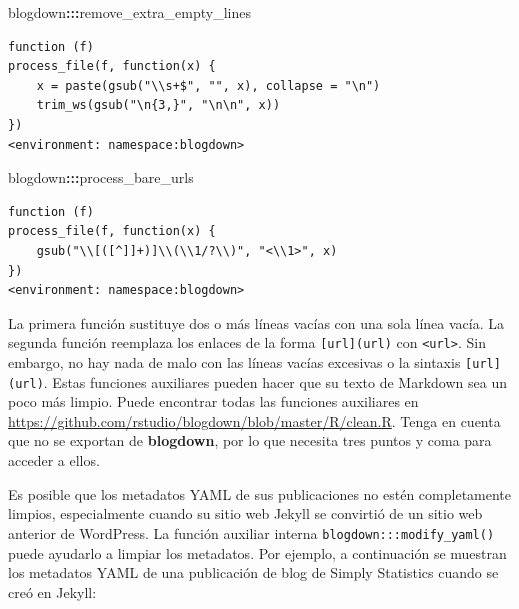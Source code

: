 \documentclass[12pt,]{krantz}
\makeatletter
\newenvironment{Shaded}{\begin{snugshade}}{\end{snugshade}}
\newcommand{\NormalTok}[1]{#1}
\newcommand{\OperatorTok}[1]{\textcolor[rgb]{0.81,0.36,0.00}{\textbf{#1}}}
\newenvironment{kframe}{%
\medskip{}
\setlength{\fboxsep}{.8em}
 \def\at@end@of@kframe{}%
 \ifinner\ifhmode%
  \def\at@end@of@kframe{\end{minipage}}%
  \begin{minipage}{\columnwidth}%
 \fi\fi%
 \def\FrameCommand##1{\hskip\@totalleftmargin \hskip-\fboxsep
 \colorbox{shadecolor}{##1}\hskip-\fboxsep
     \hskip-\linewidth \hskip-\@totalleftmargin \hskip\columnwidth}%
 \MakeFramed {\advance\hsize-\width
   \@totalleftmargin\z@ \linewidth\hsize
   \@setminipage}}%
 {\par\unskip\endMakeFramed%
 \at@end@of@kframe}
\renewenvironment{Shaded}{\begin{kframe}}{\end{kframe}}
\theoremstyle{definition}
\theoremstyle{definition}
\theoremstyle{definition}
\theoremstyle{remark}
\makeatother
\begin{document}
\begin{Shaded}
\begin{Highlighting}[]
\NormalTok{blogdown}\OperatorTok{:::}\NormalTok{remove_extra_empty_lines}
\end{Highlighting}
\end{Shaded}

\begin{verbatim}
function (f) 
process_file(f, function(x) {
    x = paste(gsub("\\s+$", "", x), collapse = "\n")
    trim_ws(gsub("\n{3,}", "\n\n", x))
})
<environment: namespace:blogdown>
\end{verbatim}

\begin{Shaded}
\begin{Highlighting}[]
\NormalTok{blogdown}\OperatorTok{:::}\NormalTok{process_bare_urls}
\end{Highlighting}
\end{Shaded}

\begin{verbatim}
function (f) 
process_file(f, function(x) {
    gsub("\\[([^]]+)]\\(\\1/?\\)", "<\\1>", x)
})
<environment: namespace:blogdown>
\end{verbatim}

La primera función sustituye dos o más líneas vacías con una sola línea
vacía. La segunda función reemplaza los enlaces de la forma
\texttt{{[}url{]}(url)} con \texttt{\textless{}url\textgreater{}}. Sin
embargo, no hay nada de malo con las líneas vacías excesivas o la
sintaxis \texttt{{[}url{]}(url)}. Estas funciones auxiliares pueden
hacer que su texto de Markdown sea un poco más limpio. Puede encontrar
todas las funciones auxiliares en
\url{https://github.com/rstudio/blogdown/blob/master/R/clean.R}. Tenga
en cuenta que no se exportan de \textbf{blogdown}, por lo que necesita
tres puntos y coma para acceder a ellos.

Es posible que los metadatos YAML de sus publicaciones no estén
completamente limpios, especialmente cuando su sitio web Jekyll se
convirtió de un sitio web anterior de WordPress. La función auxiliar
interna \texttt{blogdown:::modify\_yaml()} puede ayudarlo a limpiar los
metadatos. Por ejemplo, a continuación se muestran los metadatos YAML de
una publicación de blog de Simply Statistics cuando se creó en Jekyll:
\end{document}
